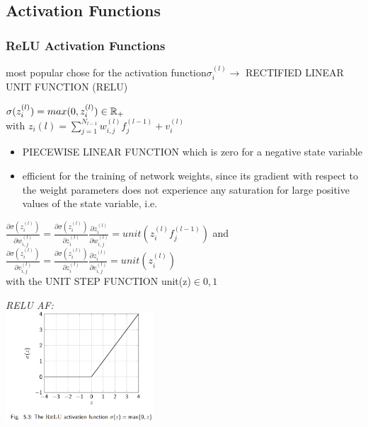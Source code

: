 \begin{sectionbox}
\subsection{Activation Functions}
\subsubsection*{ReLU Activation Functions}
most popular chose for the activation function$\sigma_i^{(l)}\rightarrow$ RECTIFIED LINEAR UNIT FUNCTION (RELU)\\
\begin{emphbox}
$\sigma(z_i^{(l)})=max(0,z_i^{(l)})\in \operatorname{\mathbb R}_+$\\
with $z_i{(l)}=\sum_{j=1}^{N_{l-1}}w_{i,j}^{(l)}f_j^{(l-1)}+v_i^{(l)}$
\end{emphbox}
\begin{itemize}
\item PIECEWISE LINEAR FUNCTION which is zero for a negative state variable
\item efficient for the training of network weights, since its gradient with respect to the weight parameters does not experience any saturation for large positive values of the state variable, i.e.
\end{itemize}
\begin{emphbox}
$\frac{\partial \sigma(z_i^{(l)})}{\partial w_{i,j}^{(l)}}=\frac{\partial\sigma(z_i^{(l)})}{\partial z_i^{(l)}}\frac{\partial z_i^{(l)}}{\partial w_{i,j}^{(l)}}=unit(z_i^{(l)}f_j^{(l-1)})$ and\\
$\frac{\partial \sigma(z_i^{(l)})}{\partial v_{i,j}^{(l)}}=\frac{\partial\sigma(z_i^{(l)})}{\partial z_i^{(l)}}\frac{\partial z_i^{(l)}}{\partial v_{i,j}^{(l)}}=unit(z_i^{(l)})$\\
with the UNIT STEP FUNCTION unit(z)$\in{0,1}$
\end{emphbox}
\parbox{5.5cm}{\emph{RELU AF:}\\ \includegraphics[width = 5.5cm]{./img/relu_af}}

\end{sectionbox}

